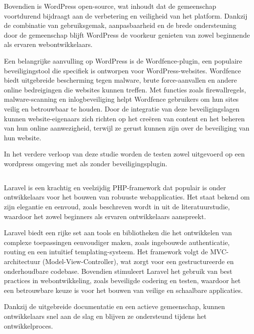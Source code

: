 Bovendien is WordPress open-source, wat inhoudt dat de 
gemeenschap voortdurend bijdraagt aan de verbetering en veiligheid van het platform. Dankzij de combinatie van gebruiksgemak, 
aanpasbaarheid en de brede ondersteuning door de gemeenschap blijft WordPress de voorkeur genieten van zowel beginnende als 
ervaren webontwikkelaars.

Een belangrijke aanvulling op WordPress is de Wordfence-plugin, een populaire beveiligingstool die specifiek is ontworpen 
voor WordPress-websites. Wordfence biedt uitgebreide bescherming tegen malware, brute force-aanvallen en andere online 
bedreigingen die websites kunnen treffen. Met functies zoals firewallregels, malware-scanning en inlogbeveiliging helpt 
Wordfence gebruikers om hun sites veilig en betrouwbaar te houden. Door de integratie van deze beveiligingslagen kunnen 
website-eigenaars zich richten op het creëren van content en het beheren van hun online aanwezigheid, terwijl ze gerust 
kunnen zijn over de beveiliging van hun website.

In het verdere verloop van deze studie worden de testen zowel uitgevoerd op een wordpress omgeving met als zonder 
beveiligingsplugin.

\subsection{}
Laravel is een krachtig en veelzijdig PHP-framework dat populair is onder ontwikkelaars voor het bouwen van robuuste 
webapplicaties. Het staat bekend om zijn elegantie en eenvoud, zoals beschreven wordt in  
uit de literatuurstudie, waardoor het zowel beginners als ervaren ontwikkelaars aanspreekt. 

Laravel biedt een rijke set aan tools en bibliotheken die het ontwikkelen van complexe toepassingen eenvoudiger 
maken, zoals ingebouwde authenticatie, routing en een intuïtief templating-systeem. Het framework volgt de MVC-architectuur 
(Model-View-Controller), wat zorgt voor een gestructureerde en onderhoudbare codebase. Bovendien stimuleert Laravel het 
gebruik van best practices in webontwikkeling, zoals beveiligde codering en testen, waardoor het een betrouwbare keuze is 
voor het bouwen van veilige en schaalbare applicaties. 

Dankzij de uitgebreide documentatie en een actieve gemeenschap, kunnen 
ontwikkelaars snel aan de slag en blijven ze ondersteund tijdens het ontwikkelproces.

